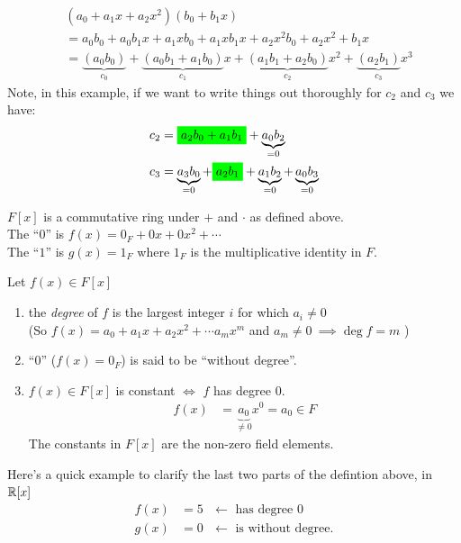 \begin{example}
    \begin{align}
        &(a_0 + a_1x + a_2x^2)(b_0 + b_1x) \nonumber  \\
        &= a_0b_0 + a_0b_1x + a_1x b_0 + a_1xb_1x + a_2x^2b_0 + a_2x^2+b_1x \nonumber \\
        &= \underbrace{(a_0b_0)}_{c_0} + \underbrace{(a_0b_1+a_1b_0)}_{c_1}x + \underbrace{(a_1b_1+a_2b_0)}_{c_2}x^2+ \underbrace{(a_2b_1)}_{c_3}x^3 \nonumber
    \end{align}
    Note, in this example, if we want to write things out thoroughly for $c_2$ and $c_3$ we have:
    \begin{align}
        c_2 &= \colorbox{green}{$a_2b_0 + a_1b_1$}+\underbrace{a_0b_2}_{=0} \nonumber \\
        c_3 &= \underbrace{a_3b_0}_{=0}+ \colorbox{green}{$a_2b_1$}+ \underbrace{a_1b_2}_{=0} + \underbrace{a_0b_3}_{=0} \nonumber
    \end{align}
\end{example}
$F[x]$ is a commutative ring under $+$ and $\cdot$ as defined above. \\ 
\noindent The ``$0$'' is $f(x) = 0_F+ 0x + 0x^2 + \cdots  $ \\
\noindent The ``$1$'' is $g(x) = 1_F$ where $1_F$ is the multiplicative identity in $F$. \\
\begin{definition}
    Let $f(x) \in F[x]$ 
    \begin{enumerate}
        \item the \textit{degree} of $f$ is the largest integer $i$ for which $a_i \neq 0$ \\ \steezybreak 
        (So $f(x) = a_0 + a_1x + a_2x^2 + \cdots a_mx^m$ and $a_m \neq 0 \ \implies \deg f = m$ )
        \item ``$0$'' ($f(x)=0_F$) is said to be ``without degree''.
        \item $f(x)\in F[x]$ is constant $\iff$ $f$ has degree $0$.
        \begin{align}
            f(x) &= \underbrace{a_0}_{\neq 0} x^0 = a_0 \in F \nonumber
        \end{align}
        The constants in $F[x]$ are the non-zero field elements.
    \end{enumerate}
\end{definition}
Here's a quick example to clarify the last two parts of the defintion above, in ${\mathbb{ R}}[x]$
\begin{align}
    f(x)&=5 \ \ \ \leftarrow \text{ has degree }0 \nonumber \\
    g(x)&=0 \ \ \ \leftarrow \text{ is without degree}. \nonumber
\end{align}

